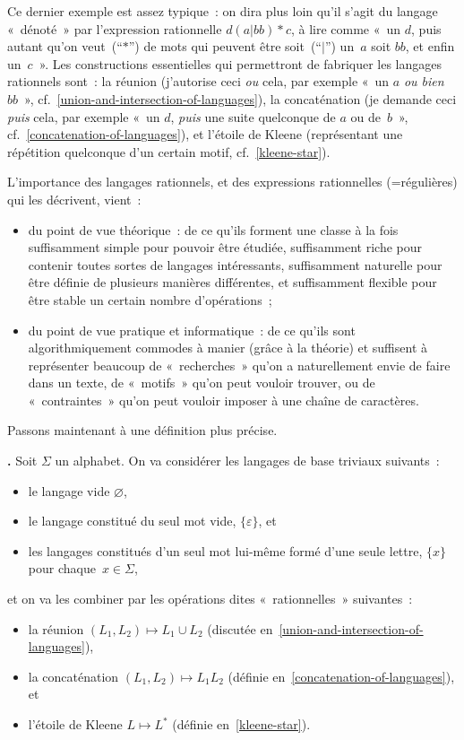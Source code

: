 \documentclass[12pt,a4paper]{article}
\theoremstyle{definition}
\newcommand\thingy{%
\refstepcounter{comcnt}\medskip\noindent\textbf{\thecomcnt.} }
\begin{document}
Ce dernier exemple est assez typique : on dira plus loin qu'il s'agit
du langage « dénoté » par l'expression rationnelle $d(a|bb){*}c$, à
lire comme « un $d$, puis autant qu'on veut (“$*$”) de mots qui
peuvent être soit (“$|$”) un $a$ soit $bb$, et enfin un $c$ ».  Les
constructions essentielles qui permettront de fabriquer les langages
rationnels sont : la réunion (j'autorise ceci \emph{ou} cela, par
exemple « un $a$ \emph{ou bien} $bb$ »,
cf. \ref{union-and-intersection-of-languages}), la concaténation (je
demande ceci \emph{puis} cela, par exemple « un $d$, \emph{puis} une
suite quelconque de $a$ ou de $b$ »,
cf. \ref{concatenation-of-languages}), et l'étoile de Kleene
(représentant une répétition quelconque d'un certain motif,
cf. \ref{kleene-star}).

\medskip

L'importance des langages rationnels, et des expressions rationnelles
(=régulières) qui les décrivent, vient :
\begin{itemize}
\item du point de vue théorique : de ce qu'ils forment une classe à la
  fois suffisamment simple pour pouvoir être étudiée, suffisamment
  riche pour contenir toutes sortes de langages intéressants,
  suffisamment naturelle pour être définie de plusieurs manières
  différentes, et suffisamment flexible pour être stable un certain
  nombre d'opérations ;
\item du point de vue pratique et informatique : de ce qu'ils sont
  algorithmiquement commodes à manier (grâce à la théorie) et
  suffisent à représenter beaucoup de « recherches » qu'on a
  naturellement envie de faire dans un texte, de « motifs » qu'on peut
  vouloir trouver, ou de « contraintes » qu'on peut vouloir imposer à
  une chaîne de caractères.
\end{itemize}

\smallskip

Passons maintenant à une définition plus précise.

\bigbreak

\thingy\label{rational-languages} Soit $\Sigma$ un alphabet.  On va
considérer les langages de base triviaux suivants :
\begin{itemize}
\item le langage vide $\varnothing$,
\item le langage constitué du seul mot vide, $\{\varepsilon\}$, et
\item les langages constitués d'un seul mot lui-même formé d'une seule
  lettre, $\{x\}$ pour chaque $x\in\Sigma$,
\end{itemize}
et on va les combiner par les opérations dites « rationnelles »
suivantes :
\begin{itemize}
\item la réunion $(L_1,L_2) \mapsto L_1 \cup L_2$
  (discutée en \ref{union-and-intersection-of-languages}),
\item la concaténation $(L_1,L_2) \mapsto L_1 L_2$
  (définie en \ref{concatenation-of-languages}), et
\item l'étoile de Kleene $L \mapsto L^*$
  (définie en \ref{kleene-star}).
\end{itemize}
\end{document}
